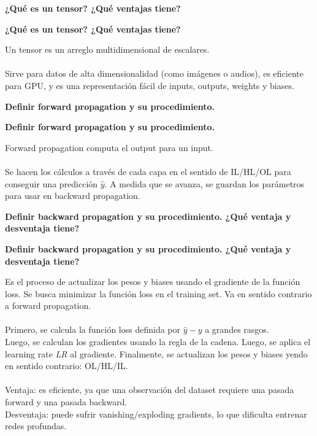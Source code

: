 \documentclass[10pt]{memoir}
\begin{document}
\clearpage
\begin{center}
	\textbf{\Large ¿Qué es un tensor? ¿Qué ventajas tiene?} \\
\end{center}

\clearpage
\begin{center}
	\textbf{\Large ¿Qué es un tensor? ¿Qué ventajas tiene?} \\
\end{center}
Un tensor es un arreglo multidimensional de escalares. \\
\\
\noindent Sirve para datos de alta dimensionalidad (como imágenes o audios), es eficiente para GPU, y es una representación fácil de inputs, outputs, weights y biases.

\clearpage
\begin{center}
	\textbf{\Large Definir forward propagation y su procedimiento.} \\
\end{center}

\clearpage
\begin{center}
	\textbf{\Large Definir forward propagation y su procedimiento.} \\
\end{center}
\noindent Forward propagation computa el output para un input. \\
\\
\noindent Se hacen los cálculos a través de cada capa en el sentido de IL/HL/OL para conseguir una predicción $\hat{y}$. A medida que se avanza, se guardan los parámetros para usar en backward propagation.

\clearpage
\begin{center}
	\textbf{\Large Definir backward propagation y su procedimiento. ¿Qué ventaja y desventaja tiene?} \\
\end{center}

\clearpage
\begin{center}
	\textbf{\Large Definir backward propagation y su procedimiento. ¿Qué ventaja y desventaja tiene?} \\
\end{center}
\noindent Es el proceso de actualizar los pesos y biases usando el gradiente de la función loss. Se busca minimizar la función loss en el training set. Va en sentido contrario a forward propagation. \\
\\
\noindent Primero, se calcula la función loss definida por $\hat{y}-y$ a grandes rasgos. \\
Luego, se calculan los gradientes usando la regla de la cadena. Luego, se aplica el learning rate \textit{LR} al gradiente.
Finalmente, se actualizan los pesos y biases yendo en sentido contrario: OL/HL/IL. \\
\\
\noindent Ventaja: es eficiente, ya que una observación del dataset requiere una pasada forward y una pasada backward. \\
Desventaja: puede sufrir vanishing/exploding gradients, lo que dificulta entrenar redes profundas.
\end{document}
